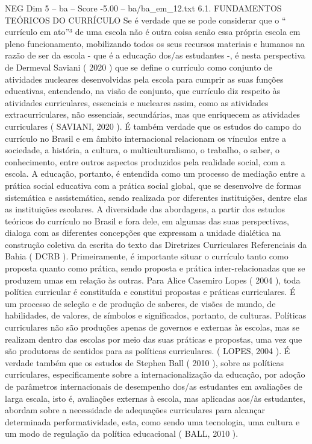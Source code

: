 \begin{textsample}{NEG Dim 5 – ba – Score -5.00 – ba/ba\_em\_12.txt}  \label{ex:f5_neg_001}
6.1.
FUNDAMENTOS TEÓRICOS DO CURRÍCULO Se é verdade que se pode considerar que o “ currículo em ato”³ de uma escola não é outra coisa senão essa própria escola em pleno funcionamento, mobilizando todos os seus recursos materiais e humanos na razão de ser da escola - que é a educação dos/as estudantes -, é nesta perspectiva de Dermeval Saviani ( 2020 ) que se define o currículo como conjunto de atividades nucleares desenvolvidas pela escola para cumprir as suas funções educativas, entendendo, na visão de conjunto, que currículo diz respeito às atividades curriculares, essenciais e nucleares assim, como as atividades extracurriculares, não essenciais, secundárias, mas que enriquecem as atividades curriculares ( SAVIANI, 2020 ).
É também verdade que os estudos do campo do currículo no Brasil e em âmbito internacional relacionam os vínculos entre a sociedade, a história, a cultura, o multiculturalismo, o trabalho, o saber, o conhecimento, entre outros aspectos produzidos pela realidade social, com a escola.
A educação, portanto, é entendida como um processo de mediação entre a prática social educativa com a prática social global, que se desenvolve de formas sistemática e assistemática, sendo realizada por diferentes instituições, dentre elas as instituições escolares.
A diversidade das abordagens, a partir dos estudos teóricos do currículo no Brasil e fora dele, em algumas das suas perspectivas, dialoga com as diferentes concepções que expressam a unidade dialética na construção coletiva da escrita do texto das Diretrizes Curriculares Referenciais da Bahia ( DCRB ).
Primeiramente, é importante situar o currículo tanto como proposta quanto como prática, sendo proposta e prática inter-relacionadas que se produzem umas em relação às outras.
Para Alice Casemiro Lopes ( 2004 ), toda política curricular é constituída e constitui propostas e práticas curriculares.
É um processo de seleção e de produção de saberes, de visões de mundo, de habilidades, de valores, de símbolos e significados, portanto, de culturas.
Políticas curriculares não são produções apenas de governos e externas às escolas, mas se realizam dentro das escolas por meio das suas práticas e propostas, uma vez que são produtoras de sentidos para as políticas curriculares. ( LOPES, 2004 ).
É verdade também que os estudos de Stephen Ball ( 2010 ), sobre as políticas curriculares, especificamente sobre a internacionalização da educação, por adoção de parâmetros internacionais de desempenho dos/as estudantes em avaliações de larga escala, isto é, avaliações externas à escola, mas aplicadas aos/às estudantes, abordam sobre a necessidade de adequações curriculares para alcançar determinada performatividade, esta, como sendo uma tecnologia, uma cultura e um modo de regulação da política educacional ( BALL, 2010 ).

\end{textsample}
